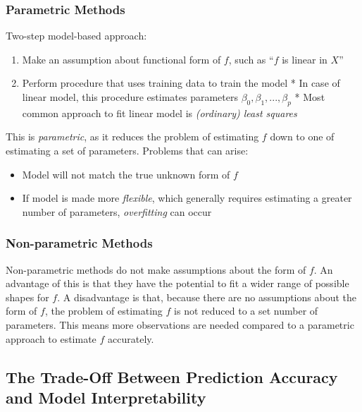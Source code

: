 \documentclass[]{book}
\providecommand{\tightlist}{%
  \setlength{\itemsep}{0pt}\setlength{\parskip}{0pt}}
\begin{document}
\hypertarget{parametric-methods}{%
\subsubsection{Parametric Methods}\label{parametric-methods}}

Two-step model-based approach:

\begin{enumerate}
\def\labelenumi{\arabic{enumi}.}
\tightlist
\item
  Make an assumption about functional form of \(f\), such as ``\(f\) is linear in \(X\)''
\item
  Perform procedure that uses training data to train the model
  * In case of linear model, this procedure estimates parameters \(β_0, β_1, ..., β_p\)
  * Most common approach to fit linear model is \emph{(ordinary) least squares}
\end{enumerate}

This is \emph{parametric}, as it reduces the problem of estimating \(f\) down to one of estimating a set of parameters. Problems that can arise:

\begin{itemize}
\tightlist
\item
  Model will not match the true unknown form of \(f\)
\item
  If model is made more \emph{flexible}, which generally requires estimating a greater number of parameters, \emph{overfitting} can occur
\end{itemize}

\hypertarget{non-parametric-methods}{%
\subsubsection{Non-parametric Methods}\label{non-parametric-methods}}

Non-parametric methods do not make assumptions about the form of \(f\). An advantage of this is that they have the potential to fit a wider range of possible shapes for \(f\). A disadvantage is that, because there are no assumptions about the form of \(f\), the problem of estimating \(f\) is not reduced to a set number of parameters. This means more observations are needed compared to a parametric approach to estimate \(f\) accurately.

\hypertarget{the-trade-off-between-prediction-accuracy-and-model-interpretability}{%
\subsection{The Trade-Off Between Prediction Accuracy and Model Interpretability}\label{the-trade-off-between-prediction-accuracy-and-model-interpretability}}
\end{document}
